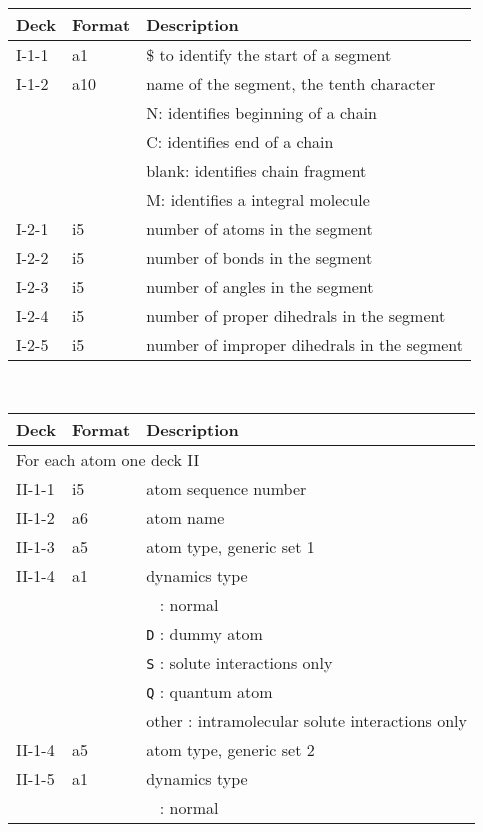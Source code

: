\begin{center}
\begin{tabular*}{150mm}{p{12mm}p{12mm}l}
\hline\hline
Deck  & Format & Description \\ \hline
I-1-1 & a1     & \$ to identify the start of a segment \\
I-1-2 & a10    & name of the segment, the tenth character\\
      &        & N: identifies beginning of a chain\\
      &        & C: identifies end of a chain\\
      &        & blank: identifies chain fragment\\
      &        & M: identifies a integral molecule\\
I-2-1 & i5     & number of atoms in the segment\\
I-2-2 & i5     & number of bonds in the segment\\
I-2-3 & i5     & number of angles in the segment\\
I-2-4 & i5     & number of proper dihedrals in the segment\\
I-2-5 & i5     & number of improper dihedrals in the segment\\
\hline
\end{tabular*}\\
\begin{tabular*}{150mm}{p{12mm}p{12mm}l}
\hline\hline
Deck & Format & Description \\ \hline
\multicolumn{3}{l}{For each atom one deck II} \\
II-1-1  & i5     & atom sequence number \\
II-1-2  & a6     & atom name \\
II-1-3  & a5     & atom type, generic set 1 \\
II-1-4  & a1     & dynamics type\\
        &        & \verb+ + : normal\\
        &        & \verb+D+ : dummy atom\\
        &        & \verb+S+ : solute interactions only\\
        &        & \verb+Q+ : quantum atom\\
        &        & other : intramolecular solute interactions only\\
II-1-4  & a5     & atom type, generic set 2 \\
II-1-5  & a1     & dynamics type\\
        &        & \verb+ + : normal\\

\end{tabular*}
\end{center}
